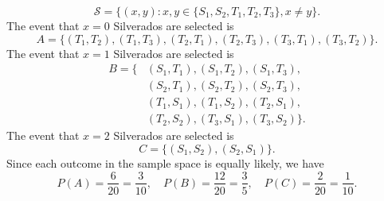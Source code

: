\documentclass[12pt]{article}
\newenvironment{problem}[2][Problem]{\begin{trivlist}
\item[\hskip \labelsep {\bfseries #1}\hskip \labelsep {\bfseries #2.}]}
{\end{trivlist}}
\begin{document}
\begin{problem}{3}
\begin{enumerate}
    \[
      \mathcal{S} = \{(x,y) : x, y \in \{S_1, S_2, T_1, T_2, T_3\}, x \neq y\}.
    \]
    The event that $x=0$ Silverados are selected is
    \[
      A = \{(T_1, T_2), (T_1, T_3), (T_2, T_1), (T_2, T_3), (T_3, T_1),
      (T_3, T_2)\}.
    \]
    The event that $x=1$ Silverados are selected is
    \[
      \begin{aligned}
      B = \{& (S_1, T_1), (S_1, T_2), (S_1, T_3),\\ 
            & (S_2, T_1), (S_2, T_2), (S_2, T_3),\\ 
            & (T_1, S_1), (T_1, S_2), (T_2, S_1),\\ 
            & (T_2, S_2), (T_3, S_1), (T_3, S_2)\}.
      \end{aligned}
    \]
    The event that $x=2$ Silverados are selected is
    \[
      C = \{(S_1, S_2), (S_2, S_1)\}.
    \]
    Since each outcome in the sample space is equally likely, we have
    \[
      P(A) = \frac{6}{20} = \frac{3}{10}, \quad P(B) = \frac{12}{20} =
      \frac{3}{5}, \quad P(C) = \frac{2}{20} = \frac{1}{10}.
    \]
  \end{enumerate}
\end{problem}
\end{document}

